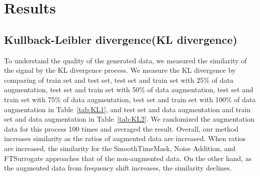 \section{Results}

\subsection{Kullback-Leibler divergence(KL divergence)}
To understand the quality of the generated data, we measured the similarity of the signal by the KL divergence process.
We measure the KL divergence by comparing of train set and test set, test set and train set with 25\% of data augmentation, test set and train set with 50\% of data augmentation, test set and train set with 75\% of data augmentation, test set and train set with 100\% of data augmentation in Table~\ref{tab:KL1}, and test set and data augmentation and train set and data augmentation in Table~\ref{tab:KL2}.
We randomized the augmentation data for this process 100 times and averaged the result.
Overall, our method increases similarity as the ratios of augmented data are increased.
When ratios are increased, the similarity for the SmoothTimeMask, Noise Addition, and FTSurrogate approaches that of the non-augmented data.
On the other hand, as the augmented data from frequency shift increases, the similarity declines.


